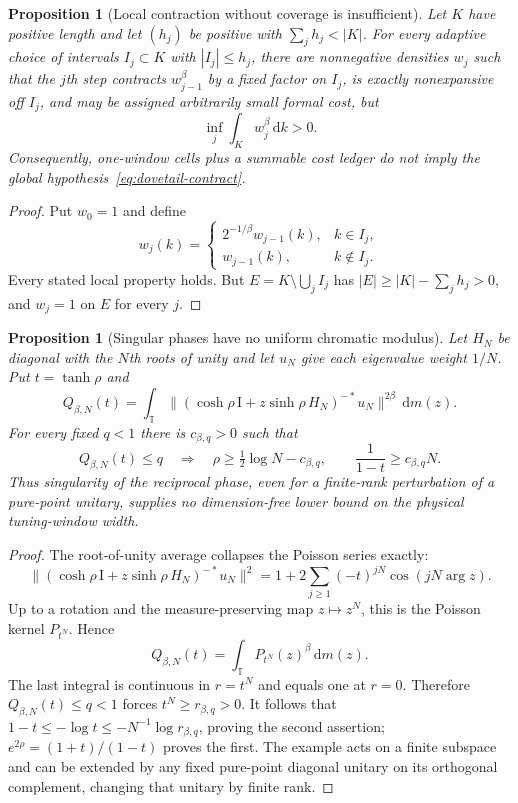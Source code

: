 \documentclass[11pt]{article}
\newtheorem{proposition}[theorem]{Proposition}
\theoremstyle{remark}
\newcommand{\T}{\mathbb T}
\newcommand{\Id}{\mathrm I}
\newcommand{\dd}{\,\mathrm d}
\begin{document}
\begin{proposition}[Local contraction without coverage is insufficient]
\label{prop:coverage-obstruction}
Let $K$ have positive length and let $(h_j)$ be positive with
$\sum_jh_j<|K|$.  For every adaptive choice of intervals
$I_j\subset K$ with $|I_j|\leq h_j$, there are nonnegative densities $w_j$
such that the $j$th step contracts $w_{j-1}^\beta$ by a fixed factor on
$I_j$, is exactly nonexpansive off $I_j$, and may be assigned arbitrarily
small formal cost, but
\[
 \inf_j\int_Kw_j^\beta\dd k>0.
\]
Consequently, one-window cells plus a summable cost ledger do not imply the
global hypothesis~\eqref{eq:dovetail-contract}.
\end{proposition}

\begin{proof}
Put $w_0=1$ and define
\[
 w_j(k)=
 \begin{cases}
  2^{-1/\beta}w_{j-1}(k),&k\in I_j,\\
  w_{j-1}(k),&k\notin I_j.
 \end{cases}
\]
Every stated local property holds.  But
$E=K\setminus\bigcup_jI_j$ has
$|E|\geq|K|-\sum_jh_j>0$, and $w_j=1$ on $E$ for every $j$.
\end{proof}

\begin{proposition}[Singular phases have no uniform chromatic modulus]
\label{prop:no-uniform-chromatic-modulus}
Let $H_N$ be diagonal with the $N$th roots of unity and let $u_N$ give each
eigenvalue weight $1/N$.  Put $t=\tanh\rho$ and
\[
 Q_{\beta,N}(t)=\int_\T
 \|(\cosh\rho\,\Id+z\sinh\rho\,H_N)^{-*}u_N\|^{2\beta}\dd m(z).
\]
For every fixed $q<1$ there is $c_{\beta,q}>0$ such that
\begin{equation}
 Q_{\beta,N}(t)\leq q
 \quad\Longrightarrow\quad
 \rho\geq\tfrac12\log N-c_{\beta,q},
 \qquad
 \frac1{1-t}\geq c_{\beta,q}N.
 \label{eq:chromatic-modulus-loss}
\end{equation}
Thus singularity of the reciprocal phase, even for a finite-rank
perturbation of a pure-point unitary, supplies no dimension-free lower bound
on the physical tuning-window width.
\end{proposition}

\begin{proof}
The root-of-unity average collapses the Poisson series exactly:
\[
 \|(\cosh\rho\,\Id+z\sinh\rho\,H_N)^{-*}u_N\|^2
 =1+2\sum_{j\geq1}(-t)^{jN}\cos(jN\arg z).
\]
Up to a rotation and the measure-preserving map $z\mapsto z^N$, this is the
Poisson kernel $P_{t^N}$.  Hence
\[
 Q_{\beta,N}(t)=\int_\T P_{t^N}(z)^\beta\dd m(z).
\]
The last integral is continuous in $r=t^N$ and equals one at $r=0$.
Therefore $Q_{\beta,N}(t)\leq q<1$ forces $t^N\geq r_{\beta,q}>0$.
It follows that
$1-t\leq-\log t\leq-N^{-1}\log r_{\beta,q}$, proving the second assertion;
$e^{2\rho}=(1+t)/(1-t)$ proves the first.  The example acts on a finite
subspace and can be extended by any fixed pure-point diagonal unitary on its
orthogonal complement, changing that unitary by finite rank.
\end{proof}
\end{document}
